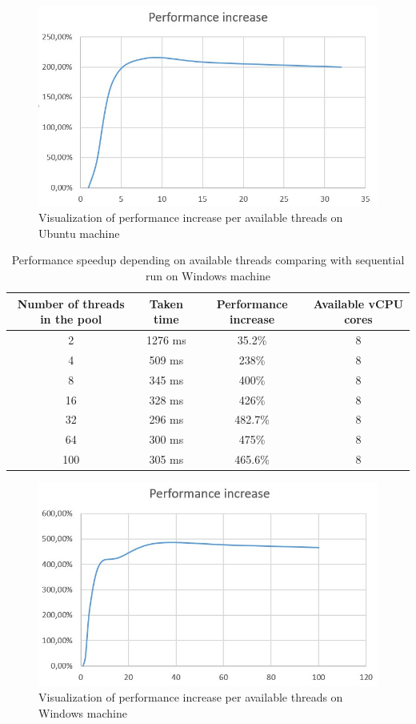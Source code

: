 \begin{figure}[h]
\centering\includegraphics[width=.8\textwidth]{img/exp/2/ubuntu-performance-increase}
\caption{Visualization of performance increase per available threads on Ubuntu machine}  \label{img:ub-perf}
\end{figure}

\begin{table}[h]
\centering\caption{Performance speedup depending on available threads comparing with sequential run on Windows machine \label{tab:comp-windows}}
\begin{tabular}{|c|c|c|c|}
\hline
\textbf{Number of threads in the pool} & \textbf{Taken time} & \textbf{Performance increase} & Available vCPU cores \\
\hline
2 & 1276 ms & 35.2\% & 8 \\
\hline
4 & 509 ms & 238\% & 8  \\
\hline
8 & 345 ms & 400\% & 8 \\
\hline
16 & 328 ms & 426\% & 8 \\
\hline
32 & 296 ms & 482.7\% & 8 \\
\hline
64 & 300 ms & 475\% & 8 \\
\hline
100 & 305 ms & 465.6\% & 8 \\
\hline
\end{tabular}
\end{table}

\begin{figure}[h]
\centering\includegraphics[width=.8\textwidth]{img/exp/2/windows-performance-increase}
\caption{Visualization of performance increase per available threads on Windows machine}  \label{img:win-perf}
\end{figure}

